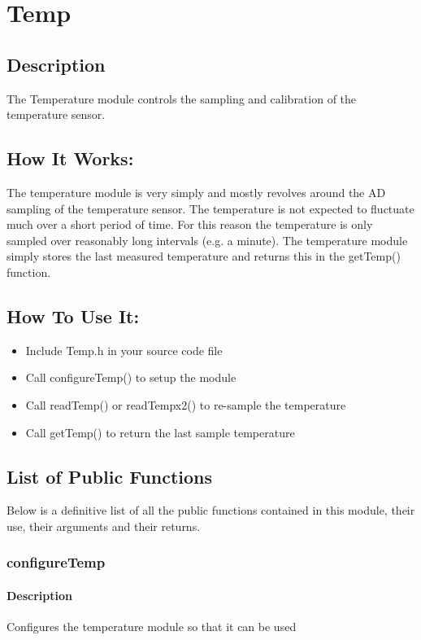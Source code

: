 \documentclass[]{report}
\begin{document}
\chapter{Temp}
\section{Description}
The Temperature module controls the sampling and calibration of the temperature sensor.

\section{How It Works:}
The temperature module is very simply and mostly revolves around the AD sampling of the temperature sensor. The temperature is not expected to fluctuate much over a short period of time. For this reason the temperature is only sampled over reasonably long intervals (e.g. a minute). The temperature module simply stores the last measured temperature and returns this in the getTemp() function.

\section{How To Use It:}
\begin{itemize}
	\item Include Temp.h in your source code file
	\item Call configureTemp() to setup the module
	\item Call readTemp() or readTempx2() to re-sample the temperature
	\item Call getTemp() to return the last sample temperature
\end{itemize}

\section{List of Public Functions}
Below is a definitive list of all the public functions contained in this module, their use, their arguments and their returns.

\subsection{configureTemp}
\subsubsection{Description}
Configures the temperature module so that it can be used
\end{document}
